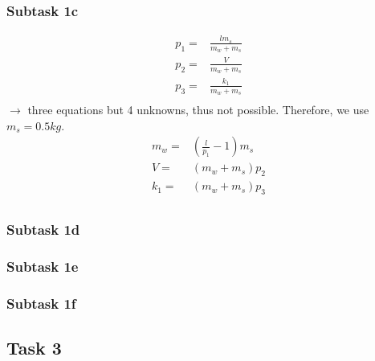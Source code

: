 \documentclass[a4paper, 12pt]{scrartcl}
\begin{document}
\subsubsection{Subtask 1c}
\begin{equation}
	\begin{split}
		p_1 = & \frac{l m_s}{m_w + m_s} \\
		p_2 = & \frac{V}{m_w + m_s} \\
		p_3 = & \frac{k_1}{m_w + m_s} \\
	\end{split}
\end{equation}
$\rightarrow$ three equations but 4 unknowns, thus not possible. Therefore, we use $m_s=0.5kg$. 
\begin{equation}
	\begin{split}
		m_w = & \left(\frac{l}{p_1} - 1\right)m_s \\
		V = & (m_w + m_s)p_2 \\
		k_1 = & (m_w + m_s)p_3 \\
	\end{split}
\end{equation}
\subsubsection{Subtask 1d}
\subsubsection{Subtask 1e}
\subsubsection{Subtask 1f}

\subsection{Task 3}
\end{document}
